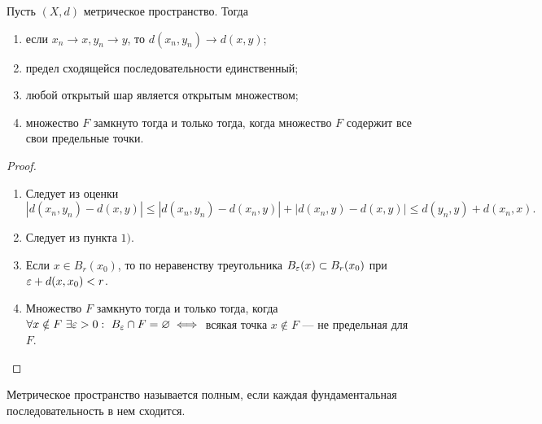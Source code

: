 \documentclass[a4paper]{article}
\theoremstyle{named}
\begin{document}
        \begin{lemma*}
            Пусть $(X, d)$ метрическое пространство. Тогда
            \begin{enumerate}
            \item
                если $x_n \to x, y_n \to y$, то $d(x_n, y_n) \to d(x, y)$;

            \item
                предел сходящейся последовательности единственный;

            \item
                любой открытый шар является открытым множеством;

            \item
                множество $F$ замкнуто тогда и только тогда, когда множество $F$ содержит все свои предельные точки.
            \end{enumerate}

            \begin{proof}
                ~

                \begin{enumerate}
                \item
                    Следует из оценки
                    \begin{equation*}
                        |d(x_n, y_n) - d(x, y)| \leq |d(x_n, y_n) - d(x_n, y)| + |d(x_n, y) - d(x, y)| \leq d(y_n, y) + d(x_n, x).
                    \end{equation*}

                \item
                    Следует из пункта $1)$.

                \item
                    Если $x \in B_r(x_0)$, то по неравенству треугольника $B_{\varepsilon}(x) \subset B_r(x_0)$ при $\varepsilon + d(x, x_0) < r$.

                \item
                    Множество $F$ замкнуто тогда и только тогда, когда $\forall x \notin F \ \exists \varepsilon > 0: \ B_{\varepsilon} \cap F = \varnothing \iff$ всякая точка $x \notin F$ --- не предельная для $F$.
                \end{enumerate}
            \end{proof}
        \end{lemma*}

        \begin{definition*}
            Метрическое пространство называется полным, если каждая фундаментальная последовательность в нем сходится.
        \end{definition*}
\end{document}
